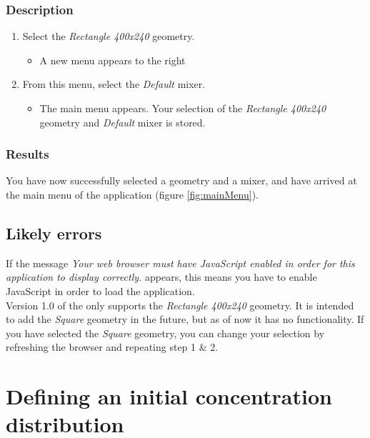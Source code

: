 \subsubsection{Description}

\begin{enumerate}
\item Select the \emph{Rectangle 400x240} geometry.
\begin{itemize}
  \item A new menu appears to the right
\end{itemize}
\item From this menu, select the \emph{Default} mixer.
\begin{itemize}
  \item The main menu appears. Your selection of the \emph{Rectangle 400x240} geometry and \emph{Default} mixer is stored.
\end{itemize}
\end{enumerate}

\subsubsection{Results}
You have now successfully selected a geometry and a mixer, and have arrived at the main menu of the application (figure \ref{fig:mainMenu}).


\subsection{Likely errors}
If the message \emph{Your web browser must have JavaScript enabled in order for this application to display correctly.} appears, this means you have to enable JavaScript in order to load the application.\\

\noindent Version 1.0 of the \applicationname{} only supports the \emph{Rectangle 400x240} geometry. It is intended to add the \emph{Square} geometry in the future, but as of now it has no functionality. If you have selected the \emph{Square} geometry, you can change your selection by refreshing the browser and repeating step 1 \& 2.\\


\section{Defining an initial concentration distribution}
\label{sec:defineDist}

